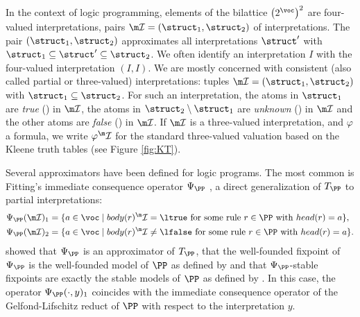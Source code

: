 	
	In the context of logic programming, elements of the bilattice $\left(2^\voc\right)^2$ are four-valued interpretations, pairs $\pstruct= (\struct_1,\struct_2)$ of interpretations.
The pair $(\struct_1,\struct_2)$ approximates all interpretations $\struct'$ with $\struct_1\subseteq \struct'\subseteq \struct_2$.
We often identify an interpretation $I$ with the four-valued interpretation $(I,I)$.
We are mostly concerned with consistent (also called partial or three-valued) interpretations: tuples $\pstruct=(\struct_1,\struct_2)$ with $\struct_1\subseteq\struct_2$. 
For such an interpretation, the atoms in $\struct_1$ are \emph{true} (\ltrue) in $\pstruct$, the atoms in $\struct_2\setminus\struct_1$ are \emph{unknown} (\lunkn) in $\pstruct$ and the other atoms are \emph{false} (\lfalse) in $\pstruct$. 
If $\pstruct$ is a three-valued interpretation, and $\varphi$ a formula, we write $\varphi^\pstruct$ for the standard three-valued valuation based on the Kleene truth tables (see Figure \ref{fig:KT}). 




Several approximators have been defined for logic programs. The most common is Fitting's immediate consequence operator $\Psi_\PP$ \cite{tcs/Fitting02}, a direct
generalization of $T_\PP$ to partial interpretations:
  \begin{align*}
    \Psi_\PP(\pstruct)_1 &=\{a\in \voc\mid body(r)^\pstruct=\ltrue \text{ for some rule $r\in \PP$ with }head(r)=a\},\\
    \Psi_\PP(\pstruct)_2 &=\{a\in \voc\mid body(r)^\pstruct\neq \lfalse \text{ for some rule $r\in \PP$ with }head(r)=a\}.
   \end{align*}
\citet{DeneckerMT00} showed that $\Psi_\PP$ is an approximator of $T_\PP$, that  the well-founded fixpoint of $\Psi_\PP$ is the well-founded model of $\PP$ as defined by \citeauthor{GelderRS91} and that $\Psi_\PP$-stable fixpoints are exactly the stable models of $\PP$ as defined by \citeauthor{iclp/GelfondL88}. In this case, 
the operator $\Psi_\PP(\cdot,y)_1$ coincides with the immediate consequence operator of the Gelfond-Lifschitz reduct \cite{iclp/GelfondL88}  of $\PP$ with respect to the interpretation $y$. 




